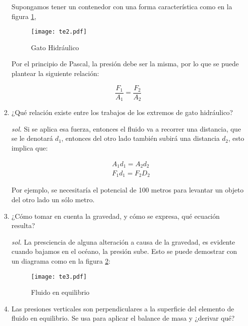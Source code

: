 \begin{enumerate}
    Supongamos tener un contenedor con una forma característica como en la figura \ref{te2},
    
    \begin{figure}[h!]
  \centering
  \texttt{[image: te2.pdf]}
  \caption{Gato Hidráulico}
  \label{te2}
\end{figure}

Por el principio de Pascal, la presión debe ser la misma, por lo que se puede plantear la siguiente relación:

\begin{equation*}
    \frac{F_1}{A_1}=\frac{F_2}{A_2}
\end{equation*}

    \item ¿Qué relación existe entre los trabajos de los extremos de gato hidráulico?
    
    \textit{sol. }
Si se aplica esa fuerza, entonces el fluido va a recorrer una distancia, que se le denotará $d_1$, entonces del otro lado también subirá una distancia $d_2$, esto implica que:

\begin{align*}
    &A_1d_1=A_2d_2\\
    &F_1d_1=F_2D_2
\end{align*}

Por ejemplo, se necesitaría el potencial de 100 metros para levantar un objeto del otro lado un sólo metro. 
    \item ¿Cómo tomar en cuenta la gravedad, y cómo se expresa, qué ecuación resulta?
    
    \textit{sol. }
La presciencia de alguna alteración a causa de la gravedad, es evidente cuando bajamos en el océano, la presión sube. Esto se puede demostrar con un diagrama como en la figura \ref{te3}:

    \begin{figure}[h!]
  \centering
  \texttt{[image: te3.pdf]}
  \caption{Fluido en equilibrio}
  \label{te3}
\end{figure}


    \item Las presiones verticales son perpendiculares a la superficie del elemento de fluido en equilibrio. Se usa para aplicar el balance de masa y ¿derivar qué?
    

\end{enumerate}
